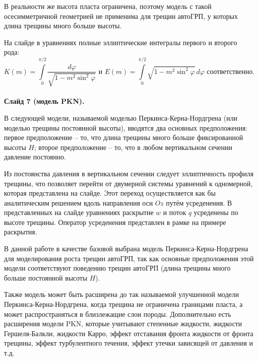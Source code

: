 \documentclass[a4paper, 12pt]{article}
\begin{document}
В реальности же высота пласта ограничена, поэтому модель с такой осесимметричной геометрией не применима для трещин автоГРП, у которых длина трещины много больше высоты.

На слайде в уравнениях полные эллиптические интегралы первого и второго рода:
$$K(m)=\int\limits_{0}^{\pi/2}{\frac{d\varphi}{\sqrt{1-m^2\sin^2{\!\varphi}}}}\text{ и } E(m)=\int\limits_{0}^{\pi/2}{\sqrt{1-m^2\sin^2{\!\varphi}}\,d\varphi}\text{ соответственно.}$$\\

\textbf{Слайд 7 (модель PKN).}

В следующей модели, называемой моделью Перкинса-Керна-Нордгрена (или моделью трещины постоянной высоты), вводятся два основных предположения: первое предположение -- то, что длина трещины много больше фиксированной высоты $H$; второе предположение -- то, что в любом вертикальном сечении давление постоянно.

Из постоянства давления в вертикальном сечении следует эллиптичность профиля трещины, что позволяет перейти от двумерной системы уравнений к одномерной, которая представлена на слайде.
Этот переход осуществляется как бы аналитическим решением вдоль направления оси $Oz$ путём усреденения.
В представленных на слайде уравнениях раскрытие $w$ и поток $q$ усреденены по высоте трещины.
Оператор усреденения представлен в рамке на примере раскрытия.

В данной работе в качестве базовой выбрана модель Перкинса-Керна-Нордгрена для моделирования роста трещин автоГРП, так как основные предположения этой модели соответствуют поведению трещин автоГРП (длина трещины много больше постоянной высоты $H$).


Также модель может быть расширена до так называемой улучшенной модели Перкинса-Керна-Нордгрена, когда трещина не ограничена границами пласта, а может распространяться в близлежащие слои породы.
Дополнительно есть расширения модели PKN, которые учитывают степенные жидкости, жидкости Гершеля-Балкли, жидкости Карро, эффект отставания фронта жидкости от фронта трещины, эффект турбулентного течения, эффект утечки зависящей от давления и т.д.
\end{document}
